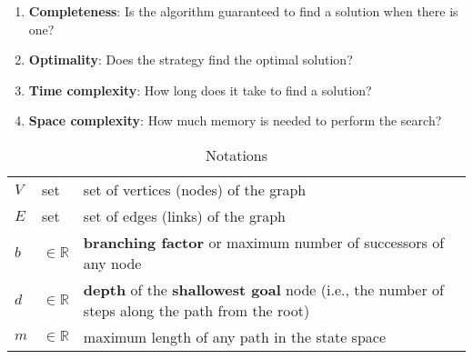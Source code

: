 \begin{enumerate}[itemsep=0.2cm]
    \item \textbf{Completeness}: Is the algorithm guaranteed to find a solution when there is one?
    \hfill \cite{ai/book/Artificial-Intelligence-A-Modern-Approach/Russell-Norvig}

    \item \textbf{Optimality}: Does the strategy find the optimal solution?
    \hfill \cite{ai/book/Artificial-Intelligence-A-Modern-Approach/Russell-Norvig}

    \item \textbf{Time complexity}: How long does it take to find a solution?
    \hfill \cite{ai/book/Artificial-Intelligence-A-Modern-Approach/Russell-Norvig}

    \item \textbf{Space complexity}: How much memory is needed to perform the search?
    \hfill \cite{ai/book/Artificial-Intelligence-A-Modern-Approach/Russell-Norvig}
\end{enumerate}


\vspace{0.5cm}

\begin{customArrayStretch}{1.3}
\begin{table}[H]
\centering
\begin{tabular}{l l p{12cm}}

$V$ & set & set of vertices (nodes) of the graph \\

$E$ & set & set of edges (links) of the graph \\

$b$ & $\in \mathbb{R}$ & \textbf{branching factor} or maximum number of successors of any node \\

$d$ & $\in \mathbb{R}$ & \textbf{depth} of the \textbf{shallowest goal} node (i.e., the number of steps along the path from the root) \\

$m$ & $\in \mathbb{R}$ & maximum length of any path in the state space \\

\end{tabular}
\caption*{Notations}
\end{table}
\end{customArrayStretch}


